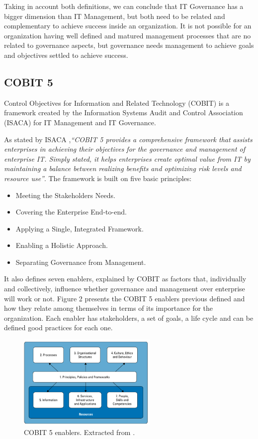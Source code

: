  Taking in account both definitions, we can conclude that IT Governance has a bigger dimension than IT Management, but both need to be related and complementary to achieve success inside an organization. It is not possible for an organization having well defined and matured management processes that are no related to governance aspects, but governance needs management to achieve goals and objectives settled to achieve success.

\subsection{COBIT 5}

Control Objectives for Information and Related Technology (COBIT) is a framework created by the Information Systems Audit and Control Association (ISACA) for IT Management and IT Governance.\par
As stated by ISACA \cite{2012cobit},\textit{``COBIT 5 provides a comprehensive framework that assists enterprises in achieving their objectives for the governance and management of enterprise IT. Simply stated, it helps enterprises create optimal value from IT by maintaining a balance between realizing benefits and optimizing risk levels and resource use''}. The framework is built on five basic principles:

\begin{itemize}
  \item Meeting the Stakeholders Needs. 
  \item Covering the Enterprise End-to-end.
  \item Applying a Single, Integrated Framework.
  \item Enabling a Holistic Approach.
  \item Separating Governance from Management.
\end{itemize}


It also defines seven enablers, explained by COBIT as factors that, individually and collectively, influence whether governance and management over enterprise will work or not. Figure 2 presents the COBIT 5 enablers previous defined and how they relate among themselves in terms of its importance for the organization. Each enabler has stakeholders, a set of goals, a life cycle and can be defined good practices for each one.\par

\begin{figure}
\centering
\includegraphics[width=0.6\textwidth]{img/Enablers.png}
\caption{COBIT 5 enablers. Extracted from \cite{2012cobit}.}
\end{figure}



